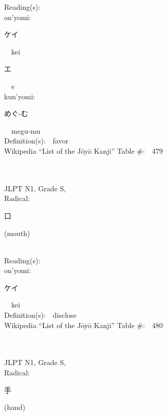 \begin{multicols}{2}
Reading(s):\ \ \\
{\hspace*{1em}}on'yomi:\ \ \\
{\hspace*{2em}}{\begin{CJK}{UTF8}{min} ケイ \end{CJK}}\ \ kei\ \ \\
{\hspace*{2em}}{\begin{CJK}{UTF8}{min} エ \end{CJK}}\ \ e\ \ \\
{\hspace*{1em}}kun'yomi:\ \ \\
{\hspace*{2em}}{\begin{CJK}{UTF8}{min} めぐ-む \end{CJK}}\ \ megu-mu\ \ \\
Definition(s):\ \ favor \\
Wikipedia ``List of the J\=oy\=o Kanji'' Table \#:\ \ 479 \\
\ \ \\
{\fontsize{34pt}{40pt}  }\ \ \\
{JLPT N1, Grade S, \\Radical:\ \ {\begin{CJK}{UTF8}{min} 口 \end{CJK}} (mouth) } \\
Reading(s):\ \ \\
{\hspace*{1em}}on'yomi:\ \ \\
{\hspace*{2em}}{\begin{CJK}{UTF8}{min} ケイ \end{CJK}}\ \ kei\ \ \\
Definition(s):\ \ disclose \\
Wikipedia ``List of the J\=oy\=o Kanji'' Table \#:\ \ 480 \\
\ \ \\
{\fontsize{34pt}{40pt}  }\ \ \\
{JLPT N1, Grade S, \\Radical:\ \ {\begin{CJK}{UTF8}{min} 手 \end{CJK}} (hand) } \\

\end{multicols}
